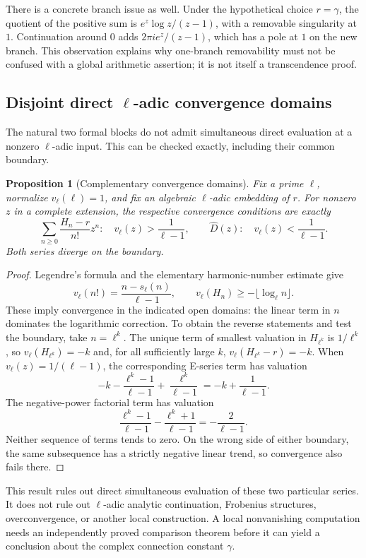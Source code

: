 \documentclass[11pt,a4paper]{article}
\newtheorem{proposition}[theorem]{Proposition}
\theoremstyle{definition}
\theoremstyle{remark}
\numberwithin{equation}{section}
\begin{document}
There is a concrete branch issue as well. Under the hypothetical
choice $r=\gamma$, the quotient of the positive sum is
$e^z\log z/(z-1)$, with a removable singularity at $1$. Continuation
around $0$ adds $2\pi i e^z/(z-1)$, which has a pole at $1$ on the
new branch. This observation explains why one-branch removability must
not be confused with a global arithmetic assertion; it is not itself
a transcendence proof.

\subsection{Disjoint direct $\ell$-adic convergence domains}
\label{gamma-padic}

The natural two formal blocks do not admit simultaneous direct
evaluation at a nonzero $\ell$-adic input. This can be checked exactly,
including their common boundary.

\begin{proposition}[Complementary convergence domains]
\label{gamma-padic-prop}
Fix a prime $\ell$, normalize $v_\ell(\ell)=1$, and fix an algebraic
$\ell$-adic embedding of $r$. For nonzero $z$ in a complete extension,
the respective convergence conditions are exactly
\[
 \sum_{n\ge0}\frac{H_n-r}{n!}z^n:
 \quad v_\ell(z)>\frac1{\ell-1},
 \qquad
 \widehat D(z):\quad v_\ell(z)<\frac1{\ell-1}.
\]
Both series diverge on the boundary.
\end{proposition}
\begin{proof}
Legendre's formula and the elementary harmonic-number estimate give
\[
 v_\ell(n!)=\frac{n-s_\ell(n)}{\ell-1},\qquad
 v_\ell(H_n)\ge-\lfloor\log_\ell n\rfloor.
\]
These imply convergence in the indicated open domains: the linear
term in $n$ dominates the logarithmic correction. To obtain the
reverse statements and test the boundary, take $n=\ell^k$. The unique
term of smallest valuation in $H_{\ell^k}$ is $1/\ell^k$, so
$v_\ell(H_{\ell^k})=-k$ and, for all sufficiently large $k$,
$v_\ell(H_{\ell^k}-r)=-k$. When
$v_\ell(z)=1/(\ell-1)$, the corresponding E-series term has valuation
\[
 -k-\frac{\ell^k-1}{\ell-1}+\frac{\ell^k}{\ell-1}
 =-k+\frac1{\ell-1}.
\]
The negative-power factorial term has valuation
\[
 \frac{\ell^k-1}{\ell-1}-\frac{\ell^k+1}{\ell-1}
 =-\frac2{\ell-1}.
\]
Neither sequence of terms tends to zero. On the wrong side of either
boundary, the same subsequence has a strictly negative linear trend,
so convergence also fails there.
\end{proof}

This result rules out direct simultaneous evaluation of these two
particular series. It does not rule out $\ell$-adic analytic
continuation, Frobenius structures, overconvergence, or another local
construction. A local nonvanishing computation needs an independently
proved comparison theorem before it can yield a conclusion about
the complex connection constant $\gamma$.
\end{document}
